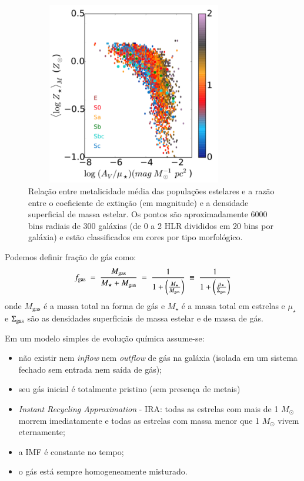 \begin{figure}
	\centering
	\includegraphics[height = 8cm, width = 9.5cm]{figuras/dust2stars.pdf}
	\caption[$A_V / \mu_\star$ vs. ]
	{Relação entre metalicidade média das populações estelares e a razão entre o coeficiente de
extinção (em magnitude) e a densidade superficial de massa estelar. Os pontos são aproximadamente
6000 bins radiais de 300 galáxias (de 0 a 2 HLR divididos em 20 bins por galáxia) e estão
classificados em cores por tipo morfológico.}
	\label{fig:dust2stars}
\end{figure}

Podemos definir fração de gás como:
\begin{equation}
	f_{\mathrm{gas}}\ =\ \frac{M_{\mathrm{gas}}}{M_\star + M_{\mathrm{gas}}}\ =\ \frac{1}{1 +
	\left(\frac{M_\star}{M_{\mathrm{gas}}}\right)}\ \equiv\ \frac{1}{1 +
	\left(\frac{\mu_\star}{\SigmaGas}\right)}
	\label{eq:fgas}
\end{equation}
\noindent onde $M_{\mathrm{gas}}$ é a massa total na forma de gás e $M_\star$ é a massa total em
estrelas e $\mu_\star$ e $\Sigma_{\mathrm{gas}}$ são as densidades superficiais de massa estelar e de massa de
gás.

Em um modelo simples de evolução química assume-se:
\begin{itemize}
	\setlength\itemsep{0.2cm}
  	\item não existir nem {\em inflow} nem {\em outflow} de gás na galáxia (isolada em um sistema
fechado sem entrada nem saída de gás);
  	\item seu gás inicial é totalmente pristino (sem presença de metais)
  	\item {\em Instant Recycling Approximation} - IRA: todas as estrelas com mais de 1 $M_\odot$
morrem imediatamente e todas as estrelas com massa menor que 1 $M_\odot$ vivem eternamente;
	\item a IMF é constante no tempo;
	\item o gás está sempre homogeneamente misturado.
\end{itemize}


